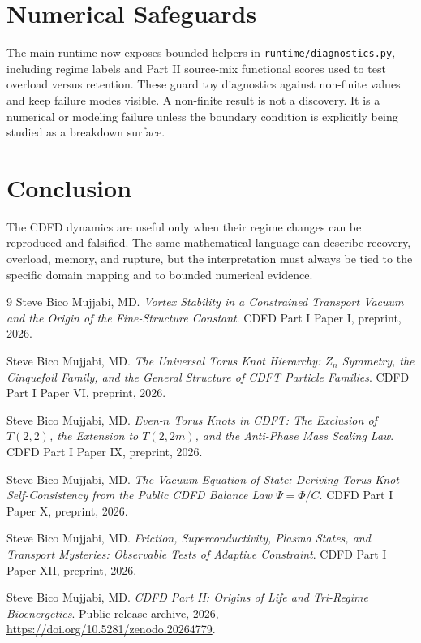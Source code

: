 \documentclass[12pt,a4paper]{article}
\begin{document}
\section{Numerical Safeguards}
The main runtime now exposes bounded helpers in \texttt{runtime/diagnostics.py},
including regime labels and Part II source-mix functional scores used to test
overload versus retention. These guard toy diagnostics against non-finite values
and keep failure modes visible. A non-finite result is not a discovery. It is a numerical or modeling
failure unless the boundary condition is explicitly being studied as a
breakdown surface.

\section{Conclusion}
The CDFD dynamics are useful only when their regime changes can be reproduced
and falsified. The same mathematical language can describe recovery, overload,
memory, and rupture, but the interpretation must always be tied to the specific
domain mapping and to bounded numerical evidence.
\begin{thebibliography}{9}
Steve Bico Mujjabi, MD. \emph{Vortex Stability in a Constrained Transport Vacuum and the Origin of the Fine-Structure Constant}. CDFD Part I Paper I, preprint, 2026.

Steve Bico Mujjabi, MD. \emph{The Universal Torus Knot Hierarchy: $Z_n$ Symmetry, the Cinquefoil Family, and the General Structure of CDFT Particle Families}. CDFD Part I Paper VI, preprint, 2026.

Steve Bico Mujjabi, MD. \emph{Even-$n$ Torus Knots in CDFT: The Exclusion of $T(2,2)$, the Extension to $T(2,2m)$, and the Anti-Phase Mass Scaling Law}. CDFD Part I Paper IX, preprint, 2026.

Steve Bico Mujjabi, MD. \emph{The Vacuum Equation of State: Deriving Torus Knot Self-Consistency from the Public CDFD Balance Law $\Psi = \Phi/C$}. CDFD Part I Paper X, preprint, 2026.

Steve Bico Mujjabi, MD. \emph{Friction, Superconductivity, Plasma States, and Transport Mysteries: Observable Tests of Adaptive Constraint}. CDFD Part I Paper XII, preprint, 2026.

Steve Bico Mujjabi, MD. \emph{CDFD Part II: Origins of Life and Tri-Regime Bioenergetics}. Public release archive, 2026, \url{https://doi.org/10.5281/zenodo.20264779}.
\end{thebibliography}
\end{document}
